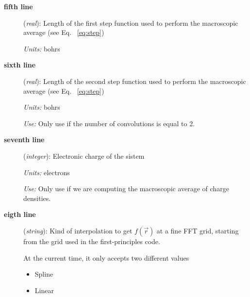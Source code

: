 \begin{description}
 \item[{\bf fifth line}] ({\it real}): 
      Length of the first step function used to perform
      the macroscopic average (see Eq. ~\ref{eq:step})

      {\it Units:} bohrs

 \item[{\bf sixth line}] ({\it real}): 
      Length of the second step function used to perform
      the macroscopic average (see Eq. ~\ref{eq:step})

      {\it Units:} bohrs

      {\it Use:} Only use if the number of convolutions is equal to 2. 

 \item[{\bf seventh line}] ({\it integer}):
      Electronic charge of the sistem

      {\it Units:} electrons

      {\it Use:} Only use if we are computing the macroscopic average of
                 charge densities. 

 \item[{\bf eigth line}] ({\it string}):
      Kind of interpolation to get $f \left( \vec{r} \right)$
      at a fine FFT grid, starting from the grid used 
      in the first-principles code.

      At the current time, it only accepts two different values

      \begin{itemize}
         \item Spline
         \item Linear
      \end{itemize}

 \end{description}


%
%

